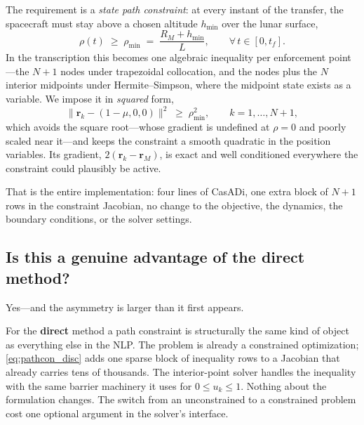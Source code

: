 \documentclass[11pt]{article}
\newcommand{\vecr}{\mathbf{r}}
\begin{document}
The requirement is a \emph{state path constraint}: at every instant of the
transfer, the spacecraft must stay above a chosen altitude $h_{\min}$ over the
lunar surface,
\begin{equation}
  \rho(t) \;\ge\; \rho_{\min} \;=\; \frac{R_M + h_{\min}}{L},
  \qquad \forall\, t \in [0, t_f].
\label{eq:pathcon}
\end{equation}
In the transcription this becomes one algebraic inequality per enforcement
point---the $N+1$ nodes under trapezoidal collocation, and the nodes plus the $N$
interior midpoints under Hermite--Simpson, where the midpoint state exists as a
variable. We impose it in \emph{squared} form,
\begin{equation}
  \lVert \vecr_k - (1-\mu,0,0) \rVert^2 \;\ge\; \rho_{\min}^2,
  \qquad k = 1,\dots,N+1,
\label{eq:pathcon_disc}
\end{equation}
which avoids the square root---whose gradient is undefined at $\rho = 0$ and
poorly scaled near it---and keeps the constraint a smooth quadratic in the
position variables. Its gradient, $2(\vecr_k - \vecr_{\!M})$, is exact and
well conditioned everywhere the constraint could plausibly be active.

That is the entire implementation: four lines of CasADi, one extra block of
$N+1$ rows in the constraint Jacobian, no change to the objective, the dynamics,
the boundary conditions, or the solver settings.

\subsection{Is this a genuine advantage of the direct method?}

Yes---and the asymmetry is larger than it first appears.

For the \textbf{direct} method a path constraint is structurally the same kind
of object as everything else in the NLP. The problem is already a constrained
optimization; \eqref{eq:pathcon_disc} adds one sparse block of inequality rows
to a Jacobian that already carries tens of thousands. The interior-point solver handles the inequality with the same
barrier machinery it uses for $0 \le u_k \le 1$. Nothing about the formulation
changes. The switch from an unconstrained to a constrained problem cost one
optional argument in the solver's interface.
\end{document}

